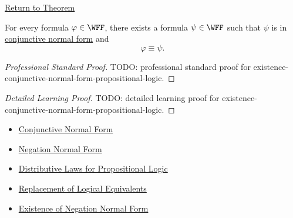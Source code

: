 \newpage
{}
\label{prf:existence-conjunctive-normal-form-propositional-logic}

\begin{remark*}[Return]
\hyperref[thm:existence-conjunctive-normal-form-propositional-logic]{Return to Theorem}
\end{remark*}

\begin{theorem*}
For every formula \(\varphi\in\WFF\), there exists a formula
\(\psi\in\WFF\) such that \(\psi\) is in
\hyperref[def:conjunctive-normal-form-propositional-logic]{conjunctive normal form}
and
\[
\varphi\equiv\psi.
\]
\end{theorem*}

\begin{proof}[Professional Standard Proof]
\LRAProofBodyStart
TODO: professional standard proof for existence-conjunctive-normal-form-propositional-logic.
\end{proof}

\begin{proof}[Detailed Learning Proof]
\LRAProofBodyStart
TODO: detailed learning proof for existence-conjunctive-normal-form-propositional-logic.
\end{proof}

\begin{remark*}
\end{remark*}

\begin{dependencies}
\begin{itemize}
  \item \hyperref[def:conjunctive-normal-form-propositional-logic]{Conjunctive Normal Form}
  \item \hyperref[def:negation-normal-form-propositional-logic]{Negation Normal Form}
  \item \hyperref[thm:distributive-laws-propositional-logic]{Distributive Laws for Propositional Logic}
  \item \hyperref[thm:replacement-of-logical-equivalents-propositional-logic]{Replacement of Logical Equivalents}
  \item \hyperref[thm:existence-negation-normal-form-propositional-logic]{Existence of Negation Normal Form}
\end{itemize}
\end{dependencies}

\clearpage
